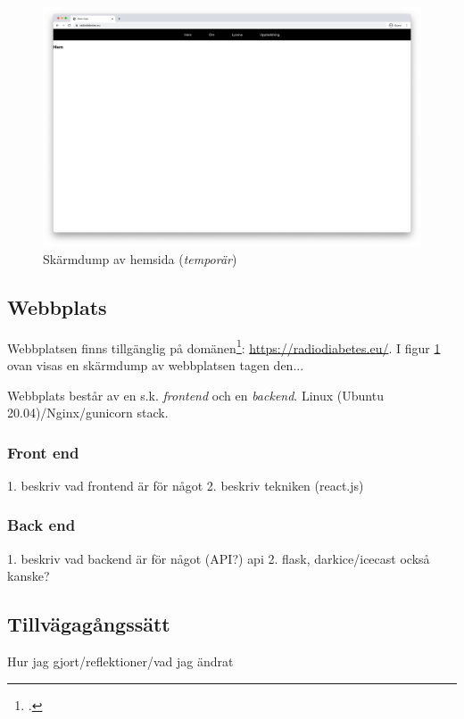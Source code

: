 \documentclass[11pt, a4paper]{article} %
\begin{document}
\begin{figure}[ht!]
\centering
\includegraphics[width=\textwidth]{../media/hemsida.png}
\caption{Skärmdump av hemsida (\emph{temporär})}
\label{hemsida}
\end{figure}

\subsection*{Webbplats}

Webbplatsen finns tillgänglig på domänen\footcite{jondell_radio_nodate}: \url{https://radiodiabetes.eu/}. I figur \ref{hemsida} ovan visas en skärmdump av webbplatsen tagen den... %

Webbplats består av en s.k. \emph{\gls{frontend}} och en \emph{\gls{backend}}. Linux (Ubuntu 20.04)/Nginx/gunicorn \gls{stack}.
\subsubsection*{Front end}
1. beskriv vad frontend är för något
2. beskriv tekniken (react.js)

\subsubsection*{Back end}
1. beskriv vad backend är för något (API?) \gls{api}
2. flask, darkice/icecast också kanske? 

\subsection*{Tillvägagångssätt}
Hur jag gjort/reflektioner/vad jag ändrat
\end{document}
